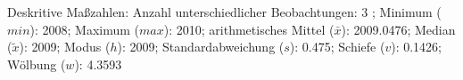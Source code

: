 				\label{tableValues:aocc241b}
				\vspace*{-\baselineskip}
                    \begin{noten}
                	    \note{} Deskritive Maßzahlen:
                	    Anzahl unterschiedlicher Beobachtungen: 3%
                	    ; 
                	      Minimum ($min$): 2008; 
                	      Maximum ($max$): 2010; 
                	      arithmetisches Mittel ($\bar{x}$): \num[round-mode=places,round-precision=2]{2009,0476}; 
                	      Median ($\tilde{x}$): 2009; 
                	      Modus ($h$): 2009; 
                	      Standardabweichung ($s$): \num[round-mode=places,round-precision=2]{0,475}; 
                	      Schiefe ($v$): \num[round-mode=places,round-precision=2]{0,1426}; 
                	      Wölbung ($w$): \num[round-mode=places,round-precision=2]{4,3593}
                     \end{noten}


